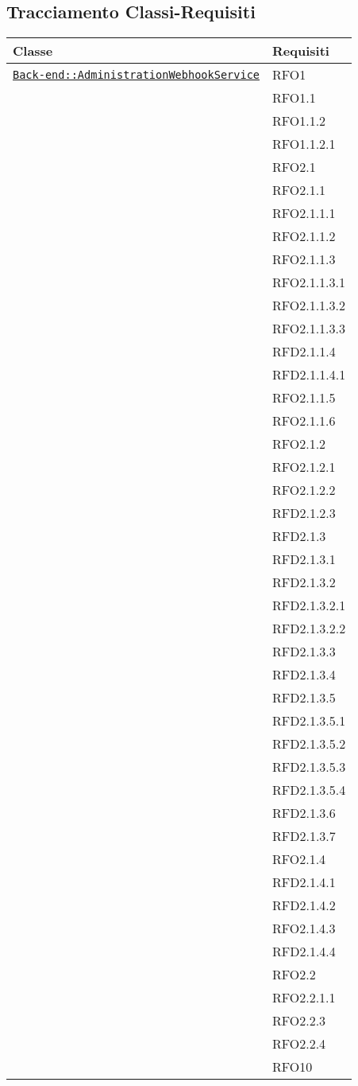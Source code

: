 \subsection{Tracciamento Classi-Requisiti}
\normalsize
\begin{longtable}{|>{\centering}m{10cm}|m{3cm}<{\centering}|}
\hline
\textbf{Classe} & \textbf{Requisiti}\\
\hline
\endhead
\hyperref[Back-end::AdministrationWebhookService]{\texttt{Back-end::AdministrationWebhookService}} & RFO1\\
& RFO1.1\\
& RFO1.1.2\\
& RFO1.1.2.1\\
& RFO2.1\\
& RFO2.1.1\\
& RFO2.1.1.1\\
& RFO2.1.1.2\\
& RFO2.1.1.3\\
& RFO2.1.1.3.1\\
& RFO2.1.1.3.2\\
& RFO2.1.1.3.3\\
& RFD2.1.1.4\\
& RFD2.1.1.4.1\\
& RFO2.1.1.5\\
& RFO2.1.1.6\\
& RFO2.1.2\\
& RFO2.1.2.1\\
& RFO2.1.2.2\\
& RFD2.1.2.3\\
& RFD2.1.3\\
& RFD2.1.3.1\\
& RFD2.1.3.2\\
& RFD2.1.3.2.1\\
& RFD2.1.3.2.2\\
& RFD2.1.3.3\\
& RFD2.1.3.4\\
& RFD2.1.3.5\\
& RFD2.1.3.5.1\\
& RFD2.1.3.5.2\\
& RFD2.1.3.5.3\\
& RFD2.1.3.5.4\\
& RFD2.1.3.6\\
& RFD2.1.3.7\\
& RFO2.1.4\\
& RFD2.1.4.1\\
& RFD2.1.4.2\\
& RFO2.1.4.3\\
& RFD2.1.4.4\\
& RFO2.2\\
& RFO2.2.1.1\\
& RFO2.2.3\\
& RFO2.2.4\\
& RFO10\\ \hline


\end{longtable}
